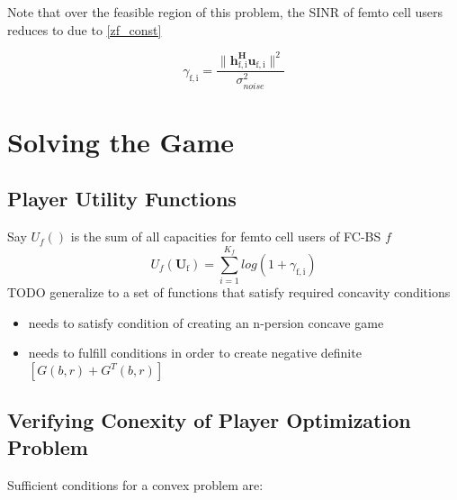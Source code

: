 \documentclass[12pt]{article}
\begin{document}
	
Note that over the feasible region of this problem, the SINR of femto cell users reduces to due to  \eqref{zf_const}

	\begin{equation}\label{zf_snr}
	\gamma_{\mathrm{f,i}} = \frac{\|\mathbf{h^H_{\mathrm{f,i}}u_{\mathrm{f,i}}}\|^2}
	{\sigma^2_{noise}  
	}
	\end{equation}

\section{Solving the Game}
\subsection{Player Utility Functions}

Say $U_f() $ is the sum of all capacities for femto cell users of FC-BS $f$ 
\begin{equation*}
U_f(\mathbf{U}_\mathrm{f}) = \sum^{K_f}_{i=1} log(1+\gamma_{\mathrm{f,i}})
\end{equation*}
TODO generalize to a set of functions that satisfy required concavity conditions
\begin{itemize}
\item needs to satisfy condition of creating an n-persion concave game
\item needs to fulfill conditions in order to create negative definite $[G(b,r)+G^{T}(b,r)] $
\end{itemize}

\subsection{Verifying Conexity of Player Optimization Problem}

Sufficient conditions for a convex problem are:
\end{document}
